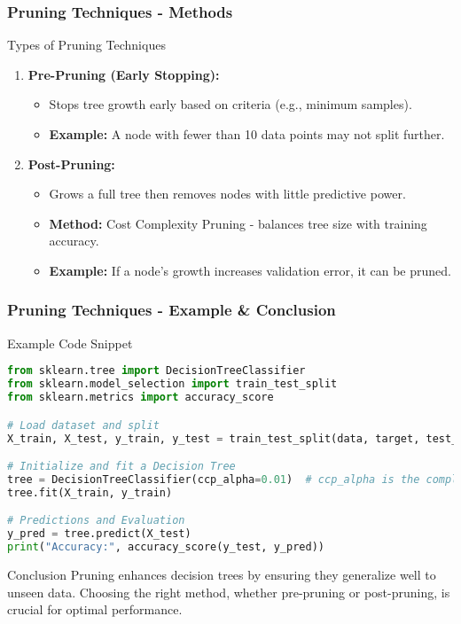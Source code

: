 \documentclass[aspectratio=169]{beamer}
\begin{document}
\begin{frame}[fragile]
    \frametitle{Pruning Techniques - Methods}

    \begin{block}{Types of Pruning Techniques}
        \begin{enumerate}
            \item \textbf{Pre-Pruning (Early Stopping):}
                \begin{itemize}
                    \item Stops tree growth early based on criteria (e.g., minimum samples).
                    \item \textbf{Example:} A node with fewer than 10 data points may not split further.
                \end{itemize}

            \item \textbf{Post-Pruning:}
                \begin{itemize}
                    \item Grows a full tree then removes nodes with little predictive power.
                    \item \textbf{Method:} Cost Complexity Pruning - balances tree size with training accuracy.
                    \item \textbf{Example:} If a node's growth increases validation error, it can be pruned.
                \end{itemize}
        \end{enumerate}
    \end{block}

\end{frame}

\begin{frame}[fragile]
    \frametitle{Pruning Techniques - Example & Conclusion}

    \begin{block}{Example Code Snippet}
        \begin{lstlisting}[language=Python]
from sklearn.tree import DecisionTreeClassifier
from sklearn.model_selection import train_test_split
from sklearn.metrics import accuracy_score

# Load dataset and split
X_train, X_test, y_train, y_test = train_test_split(data, target, test_size=0.2, random_state=42)

# Initialize and fit a Decision Tree
tree = DecisionTreeClassifier(ccp_alpha=0.01)  # ccp_alpha is the complexity parameter
tree.fit(X_train, y_train)

# Predictions and Evaluation
y_pred = tree.predict(X_test)
print("Accuracy:", accuracy_score(y_test, y_pred))
        \end{lstlisting}
    \end{block}

    \begin{block}{Conclusion}
        Pruning enhances decision trees by ensuring they generalize well to unseen data. Choosing the right method, whether pre-pruning or post-pruning, is crucial for optimal performance.
    \end{block}

\end{frame}
\end{document}
